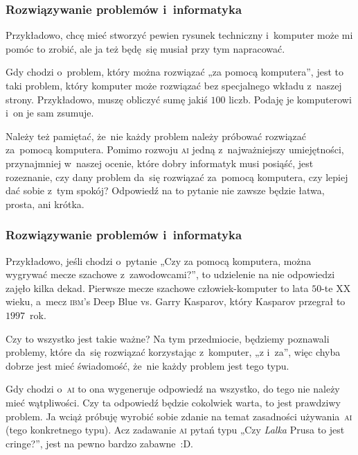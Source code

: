 \documentclass[10pt,t]{beamer}
\begin{document}
\begin{frame}
  \frametitle{Rozwiązywanie problemów i~informatyka}


  Przykładowo, chcę mieć stworzyć pewien rysunek techniczny i~komputer
  może mi pomóc to zrobić, ale ja też będę~się musiał przy tym napracować.

  Gdy chodzi o~problem, który można rozwiązać „za pomocą komputera”, jest to
  taki problem, który komputer może rozwiązać bez specjalnego wkładu
  z~naszej strony. Przykładowo, muszę obliczyć sumę jakiś $100$ liczb.
  Podaję je komputerowi i~on je sam zsumuje.

  Należy też pamiętać, że~nie każdy problem należy próbować rozwiązać
  za~pomocą komputera. Pomimo rozwoju \textsc{ai} jedną z~najważniejszy
  umiejętności, przynajmniej w~naszej ocenie, które dobry informatyk musi
  posiąść, jest rozeznanie, czy dany problem da~się rozwiązać za~pomocą
  komputera, czy lepiej dać sobie z~tym spokój? Odpowiedź na to pytanie nie
  zawsze będzie łatwa, prosta, ani krótka.

\end{frame}





\begin{frame}
  \frametitle{Rozwiązywanie problemów i~informatyka}


  Przykładowo, jeśli chodzi o~pytanie „Czy za pomocą komputera, można
  wygrywać mecze szachowe z~zawodowcami?”, to udzielenie na nie odpowiedzi
  zajęło kilka dekad. Pierwsze mecze szachowe człowiek-komputer to lata
  $50$-te XX wieku, a~mecz \textsc{ibm}'s Deep Blue vs. Garry Kasparov,
  który Kasparov przegrał to~$1997$~rok.

  Czy to wszystko jest takie ważne? Na tym przedmiocie, będziemy poznawali
  problemy, które da~się rozwiązać korzystając z~komputer, „z i~za”, więc
  chyba dobrze jest mieć świadomość, że~nie każdy problem jest tego typu.

  Gdy chodzi o~\textsc{ai} to ona wygeneruje odpowiedź na wszystko, do tego
  nie należy mieć wątpliwości. Czy ta odpowiedź będzie cokolwiek warta, to
  jest prawdziwy problem. Ja wciąż próbuję wyrobić sobie zdanie na temat
  zasadności używania~\textsc{ai} (tego konkretnego typu). Acz zadawanie
  \textsc{ai} pytań typu „Czy \textit{Lalka} Prusa to jest cringe?”, jest
  na pewno bardzo zabawne~:D.

\end{frame}
\end{document}
